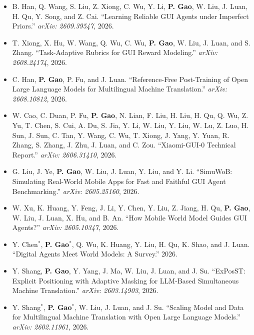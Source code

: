 \documentclass{resume}
\begin{document}
\begin{itemize}[parsep=0.2ex]

\item {B. Han, Q. Wang, S. Liu, Z. Xiong, C. Wu, Y. Li, {\bf P. Gao}, W. Liu, J. Luan, H. Qu, Y. Song, and Z. Cai. ``Learning Reliable GUI Agents under Imperfect Priors.'' \emph{arXiv: 2609.39547}, 2026.}

\item {T. Xiong, X. Hu, W. Wang, Q. Wu, C. Wu, {\bf P. Gao}, W. Liu, J. Luan, and S. Zhang. ``Task-Adaptive Rubrics for GUI Reward Modeling.'' \emph{arXiv: 2608.24174}, 2026.}

\item {C. Han, {\bf P. Gao}, P. Fu, and J. Luan. ``Reference-Free Post-Training of Open Large Language Models for Multilingual Machine Translation.'' \emph{arXiv: 2608.10812}, 2026.}

\item {W. Cao, C. Duan, P. Fu, {\bf P. Gao}, N. Lian, F. Liu, H. Liu, H. Qu, Q. Wu, Z. Yu, T. Chen, S. Cui, A. Du, S. Jia, Y. Li, W. Liu, Y. Liu, W. Lu, Z. Luo, H. Sun, J. Sun, C. Tan, Y. Wang, C. Wu, T. Xiong, J. Yang, Y. Yuan, R. Zhang, S. Zhang, J. Zhu, J. Luan, and C. Zou. ``Xiaomi-GUI-0 Technical Report.'' \emph{arXiv: 2606.31410}, 2026.}

\item {G. Liu, J. Ye, {\bf P. Gao}, W. Liu, J. Luan, Y. Liu, and Y. Li. ``SimuWoB: Simulating Real-World Mobile Apps for Fast and Faithful GUI Agent Benchmarking.'' \emph{arXiv: 2605.25160}, 2026.}

\item {W. Xu, K. Huang, Y. Feng, J. Li, Y. Chen, Y. Liu, Z. Jiang, H. Qu, {\bf P. Gao}, W. Liu, J. Luan, X. Hu, and B. An. ``How Mobile World Model Guides GUI Agents?'' \emph{arXiv: 2605.10347}, 2026.}

\item {Y. Chen$^*$, {\bf P. Gao}$^*$, Q. Wu, K. Huang, Y. Liu, H. Qu, K. Shao, and J. Luan. ``Digital Agents Meet World Models: A Survey.'' 2026.}

\item {Y. Shang, {\bf P. Gao}, Y. Yang, J. Ma, W. Liu, J. Luan, and J. Su. ``ExPosST: Explicit Positioning with Adaptive Masking for LLM-Based Simultaneous Machine Translation.'' \emph{arXiv: 2603.14903}, 2026.}

\item {Y. Shang$^*$, {\bf P. Gao}$^*$, W. Liu, J. Luan, and J. Su. ``Scaling Model and Data for Multilingual Machine Translation with Open Large Language Models.'' \emph{arXiv: 2602.11961}, 2026.}


\end{itemize}
\end{document}
